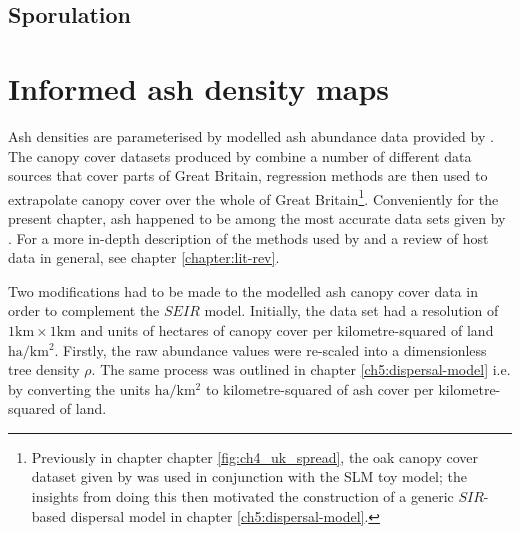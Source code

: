 

\subsection{Sporulation}




\section{Informed ash density maps}

Ash densities are parameterised by modelled ash abundance data provided by \cite{hill.data}. The canopy cover datasets produced by \cite{hill.data} combine a number of different data sources that cover parts of Great Britain, regression methods are then used to extrapolate canopy cover over the whole of Great Britain\footnote{Previously in chapter chapter \ref{fig:ch4_uk_spread}, the oak canopy cover dataset given by \cite{hill.data} was used in conjunction with the SLM toy model; the insights from doing this then motivated the construction of a generic $SIR$-based dispersal model in chapter \ref{ch5:dispersal-model}.}. Conveniently for the present chapter, ash happened to be among the most accurate data sets given by \cite{hill.data}. For a more in-depth description of the methods used by \cite{hill.data} and a review of host data in general, see chapter \ref{chapter:lit-rev}.

 Two modifications had to be made to the modelled ash canopy cover data in order to complement the $SEIR$ model. Initially, the data set had a resolution of $\mathrm{1km}\times \mathrm{1km}$ and units of hectares of canopy cover per kilometre-squared of land $\mathrm{ha/km^2}$. Firstly, the raw abundance values were re-scaled into a dimensionless tree density $\rho$. The same process was outlined in chapter \ref{ch5:dispersal-model} i.e. by converting the units $\mathrm{ha/km^2}$ to kilometre-squared of ash cover per kilometre-squared of land. 
 
